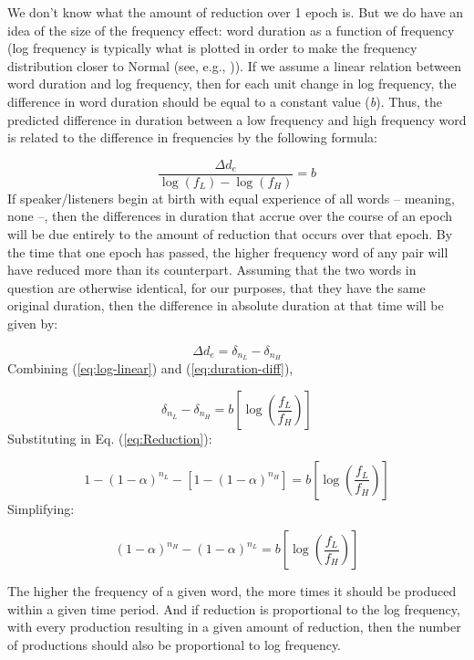 We don't know what the amount of reduction over 1 epoch is. But we
do have an idea of the size of the frequency effect: word duration
as a function of frequency (log frequency is typically what is plotted
in order to make the frequency distribution closer to Normal (see,
e.g., \citet{gahl2012reduce})). If we assume a linear relation between
word duration and log frequency, then for each unit change in log
frequency, the difference in word duration should be equal to a constant
value (\emph{b}). Thus, the predicted difference in duration between
a low frequency and high frequency word is related to the difference
in frequencies by the following formula: 

\begin{equation}
\frac{\Delta d_{e}}{\log(f_{L})-\log(f_{H})}=b\label{eq:log-linear}
\end{equation}
If speaker/listeners begin at birth with equal experience of all words
– meaning, none –, then the differences in duration that accrue over
the course of an epoch will be due entirely to the amount of reduction
that occurs over that epoch. By the time that one epoch has passed,
the higher frequency word of any pair will have reduced more than
its counterpart. Assuming that the two words in question are otherwise
identical, for our purposes, that they have the same original duration,
then the difference in absolute duration at that time will be given
by:

\begin{equation}
\Delta d_{e}=\delta_{n_{L}}-\delta_{n_{H}}\label{eq:duration-diff}
\end{equation}
Combining (\ref{eq:log-linear}) and (\ref{eq:duration-diff}),

\begin{equation}
\delta_{n_{L}}-\delta_{n_{H}}=b\left[\log\left(\frac{f_{L}}{f_{H}}\right)\right]
\end{equation}
Substituting in Eq. (\ref{eq:Reduction}):

\begin{equation}
1-(1-\alpha)^{n_{L}}-[1-(1-\alpha)^{n_{H}}]=b\left[\log\left(\frac{f_{L}}{f_{H}}\right)\right]
\end{equation}
Simplifying:

\begin{equation}
(1-\alpha)^{n_{H}}-(1-\alpha)^{n_{L}}=b\left[\log\left(\frac{f_{L}}{f_{H}}\right)\right]\label{eq:reduction-to-freq}
\end{equation}

The higher the frequency of a given word, the more times it should
be produced within a given time period. And if reduction is proportional
to the log frequency, with every production resulting in a given amount
of reduction, then the number of productions should also be proportional
to log frequency. 


